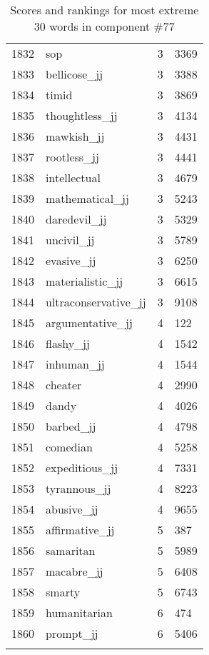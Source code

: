 \begin{longtable}[!htbp]{| rlr@{.}l |}
    1832 & sop & 3 & 3369 \\
    1833 & bellicose\_jj & 3 & 3388 \\
    1834 & timid & 3 & 3869 \\
    1835 & thoughtless\_jj & 3 & 4134 \\
    1836 & mawkish\_jj & 3 & 4431 \\
    1837 & rootless\_jj & 3 & 4441 \\
    1838 & intellectual & 3 & 4679 \\
    1839 & mathematical\_jj & 3 & 5243 \\
    1840 & daredevil\_jj & 3 & 5329 \\
    1841 & uncivil\_jj & 3 & 5789 \\
    1842 & evasive\_jj & 3 & 6250 \\
    1843 & materialistic\_jj & 3 & 6615 \\
    1844 & ultraconservative\_jj & 3 & 9108 \\
    1845 & argumentative\_jj & 4 & 122 \\
    1846 & flashy\_jj & 4 & 1542 \\
    1847 & inhuman\_jj & 4 & 1544 \\
    1848 & cheater & 4 & 2990 \\
    1849 & dandy & 4 & 4026 \\
    1850 & barbed\_jj & 4 & 4798 \\
    1851 & comedian & 4 & 5258 \\
    1852 & expeditious\_jj & 4 & 7331 \\
    1853 & tyrannous\_jj & 4 & 8223 \\
    1854 & abusive\_jj & 4 & 9655 \\
    1855 & affirmative\_jj & 5 & 387 \\
    1856 & samaritan & 5 & 5989 \\
    1857 & macabre\_jj & 5 & 6408 \\
    1858 & smarty & 5 & 6743 \\
    1859 & humanitarian & 6 & 474 \\
    1860 & prompt\_jj & 6 & 5406 \\
    \hline
    \caption{Scores and rankings for most extreme 30 words in component \#77} \\
\end{longtable}
